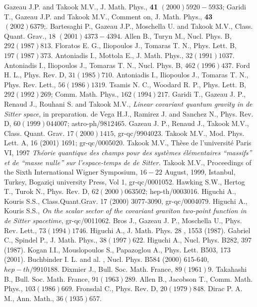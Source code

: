 \documentclass[a4paper,11pt,showpacs,preprintnumbers]{revtex4}
\begin{document}
\begin{thebibliography}{99}

 Gazeau J.P. and Takook M.V., J. Math.
Phys., {\bf 41} $(2000) 5920-5933$; Garidi T., Gazeau J.P. and
Takook M.V., Comment on, J. Math. Phys., {\bf 43} $(2002) 6379$;.
 Bartesaghi P., Gazeau J.P.,
Moschella U. and Takook M.V.,  Class. Quant. Grav., $18$ $
(2001)4373-4394$.
  Allen B., Turyn M., Nucl. Phys. B,
$292 (1987) 813$.
 Floratos E. G., Iliopoulos J.,
Tomaras T. N., Phys. Lett. B, $197(1987)373$.
  Antoniadis I., Mottola  E., J. Math.
Phys.,  $32 (1991)1037 $.
  Antoniadis I., Iliopoulos  J.,
Tomaras T. N., Nucl. Phys. B, $462(1996)437$.
 Ford H. L., Phys. Rev. D, $31(1985)710$.
 Antoniadis I., Iliopoulos  J.,
Tomaras T. N., Phys.
Rev. Lett.,
 $56(1986) 1319$.
  Tsamis N. C., Woodard R. P., Phys.
Lett. B, $292 (1992) 269$; Comm. Math. Phys., $162(1994)217$.
  Garidi T., Gazeau J. P., Renaud J.,
Rouhani S. and Takook M.V., {\it Linear covariant quantum gravity
in de Sitter space}, in preparation.
 de Vega H.J., Ramirez J. and Sanchez
N., Phys. Rev. D, $60(1999)044007$;
 astro-ph/$9812465$.
  Gazeau J. P., Renaud J., Takook
M.V., Class. Quant. Grav. $17(2000)1415$, gr-qc/$9904023$.
  Takook M.V., Mod. Phys. Lett. A, 16 (2001) 1691;
gr-qc/0005020.
 Takook M.V., Th\`ese de l'universit\'e Paris VI, 1997
{\it Th\'eorie quantique des champs pour des syst\`emes
\'el\'ementaires ``massifs'' et de ``masse nulle'' sur
l'espace-temps de de Sitter.}  Takook M.V., Proceedings of the
Sixth International Wigner Symposium,  $16-22$ August, 1999,
Istanbul, Turkey, Bogazi\c{c}i university Press, Vol 1,
gr-qc/0001052.
  Hawking S.W., Hertog T., Turok N.,
 Phys. Rev. D, $62(2000)063502$; hep-th/0003016.
  Higuchi A., Kouris S.S.,
Class.Quant.Grav. 17 (2000) 3077-3090, gr-qc/0004079.
  Higuchi A., Kouris S.S., {\it On the
scalar sector of the covariant graviton two-point function in de
Sitter spacetime}, gr-qc/0011062.
 Bros J., Gazeau J. P., Moschella U.,
Phys. Rev. Lett., $73 (1994) 1746$.
 Higuchi A.,  J. Math. Phys. 28 , 1553
(1987).
 Gabriel C., Spindel P., J. Math. Phys.,
$38 (1997) 622$.
 Higuchi A.,  Nucl. Phys. B282, 397
(1987).
  Kogan I.I., Mouslopoulos S.,
Papazoglou A., Phys. Lett. B503, 173 (2001).
 Buchbinder I. L. and al. , Nucl. Phys.
B584 (2000) 615-640, $hep-th/9910188$.
 Dixmier J., Bull. Soc. Math. France, $89
(1961) 9$.
 Takahashi B., Bull. Soc. Math. France, $91
(1963) 289$.
 Allen B., Jacobson T., Comm.
Math. Phys., $103 (1986) 669$.
 Fronsdal C., Phys. Rev. D, $20 (1979)
848$.
 Dirac P. A. M., Ann.  Math., $36 (1935) 657 $.


\end{thebibliography}
\end{document}
